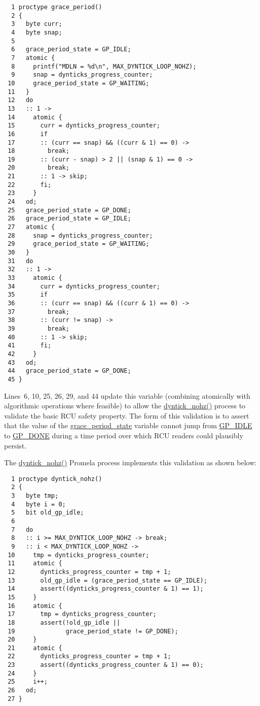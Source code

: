 { \scriptsize
\begin{verbatim}
  1 proctype grace_period()
  2 {
  3   byte curr;
  4   byte snap;
  5 
  6   grace_period_state = GP_IDLE;
  7   atomic {
  8     printf("MDLN = %d\n", MAX_DYNTICK_LOOP_NOHZ);
  9     snap = dynticks_progress_counter;
 10     grace_period_state = GP_WAITING;
 11   }
 12   do
 13   :: 1 ->
 14     atomic {
 15       curr = dynticks_progress_counter;
 16       if
 17       :: (curr == snap) && ((curr & 1) == 0) ->
 18         break;
 19       :: (curr - snap) > 2 || (snap & 1) == 0 ->
 20         break;
 21       :: 1 -> skip;
 22       fi;
 23     }
 24   od;
 25   grace_period_state = GP_DONE;
 26   grace_period_state = GP_IDLE;
 27   atomic {
 28     snap = dynticks_progress_counter;
 29     grace_period_state = GP_WAITING;
 30   }
 31   do
 32   :: 1 ->
 33     atomic {
 34       curr = dynticks_progress_counter;
 35       if
 36       :: (curr == snap) && ((curr & 1) == 0) ->
 37         break;
 38       :: (curr != snap) ->
 39         break;
 40       :: 1 -> skip;
 41       fi;
 42     }
 43   od;
 44   grace_period_state = GP_DONE;
 45 }
\end{verbatim}
}

Lines~6, 10, 25, 26, 29, and 44 update this variable (combining
atomically with algorithmic operations where feasible) to
allow the \url{dyntick_nohz()} process to validate the basic
RCU safety property.
The form of this validation is to assert that the value of the
\url{grace_period_state} variable cannot jump from
\url{GP_IDLE} to \url{GP_DONE} during a time period
over which RCU readers could plausibly persist.

 \QuickQuizEnd

The \url{dyntick_nohz()} Promela process implements
this validation as shown below:

{ \scriptsize
\begin{verbatim}
  1 proctype dyntick_nohz()
  2 {
  3   byte tmp;
  4   byte i = 0;
  5   bit old_gp_idle;
  6 
  7   do
  8   :: i >= MAX_DYNTICK_LOOP_NOHZ -> break;
  9   :: i < MAX_DYNTICK_LOOP_NOHZ ->
 10     tmp = dynticks_progress_counter;
 11     atomic {
 12       dynticks_progress_counter = tmp + 1;
 13       old_gp_idle = (grace_period_state == GP_IDLE);
 14       assert((dynticks_progress_counter & 1) == 1);
 15     }
 16     atomic {
 17       tmp = dynticks_progress_counter;
 18       assert(!old_gp_idle ||
 19              grace_period_state != GP_DONE);
 20     }
 21     atomic {
 22       dynticks_progress_counter = tmp + 1;
 23       assert((dynticks_progress_counter & 1) == 0);
 24     }
 25     i++;
 26   od;
 27 }
\end{verbatim}
}

